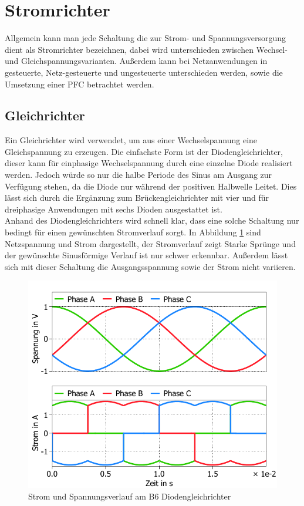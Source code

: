 \section{Stromrichter}
\label{sec:Stromrichter}
Allgemein kann man jede Schaltung die zur Strom- und Spannungsversorgung dient als Stromrichter bezeichnen, dabei wird unterschieden zwischen Wechsel- und Gleichspannungsvarianten. Außerdem kann bei Netzanwendungen in gesteuerte, Netz-gesteuerte und ungesteuerte unterschieden werden, sowie die Umsetzung einer \gls{PFC} betrachtet werden. 
		\subsection{Gleichrichter}
		Ein Gleichrichter wird verwendet, um aus einer Wechselspannung eine Gleichspannung zu erzeugen. Die einfachste Form ist der Diodengleichrichter, dieser kann für einphasige Wechselspannung durch eine einzelne Diode realisiert werden. Jedoch würde so nur die halbe Periode des Sinus am Ausgang zur Verfügung stehen, da die Diode nur während der positiven Halbwelle Leitet. Dies lässt sich durch die Ergänzung zum Brückengleichrichter mit vier und für dreiphasige Anwendungen mit sechs Dioden ausgestattet ist.\\
		Anhand des Diodengleichrichters wird schnell klar, dass eine solche Schaltung nur bedingt für einen gewünschten Stromverlauf sorgt. In Abbildung \ref{fig:B6DiodRect} sind Netzspannung und Strom dargestellt, der Stromverlauf zeigt Starke Sprünge und der gewünschte Sinusförmige Verlauf ist nur schwer erkennbar. Außerdem lässt sich mit dieser Schaltung die Ausgangsspannung sowie der Strom nicht variieren.
		\begin{figure}[H]
			\centering
			\includegraphics[width=0.7\linewidth]{content/Grafiken/B6-Diodengleichrichter-Eingangsverlauf}
			\caption{Strom und Spannungsverlauf am B6 Diodengleichrichter}
			\label{fig:B6DiodRect}
		\end{figure}
		
